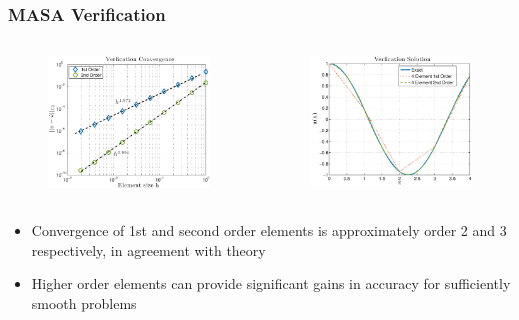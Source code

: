 \documentclass[unknownkeysallowed,12pt,mathserif]{beamer}
\begin{document}
\begin{frame}

\frametitle{MASA Verification}

\begin{columns}[c]
\begin{column}{6.5cm}
\begin{figure}[!htbp] 
\includegraphics[width=6.5cm]{convergence.eps}
\end{figure}
\end{column}
\begin{column}{6.5cm}
\begin{figure}[!htbp] 
\includegraphics[width=6.5cm]{interpolation.eps}
\end{figure}
\end{column}
\end{columns}
\begin{itemize}
\item \small Convergence of 1st and second order elements is approximately order 2 and 3 respectively, in agreement with theory
\item \small Higher order elements can provide significant gains in accuracy for sufficiently smooth problems
\end{itemize}

\end{frame}
\end{document}
